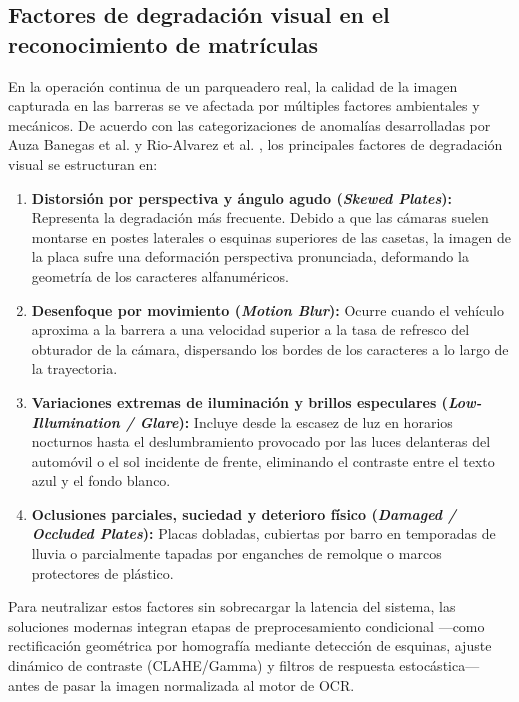 \subsection{Factores de degradación visual en el reconocimiento de matrículas}

En la operación continua de un parqueadero real, la calidad de la imagen
capturada en las barreras se ve afectada por múltiples factores ambientales y
mecánicos. De acuerdo con las categorizaciones de anomalías desarrolladas por
Auza Banegas et al. \cite{auzabanegas2026blpr} y Rio-Alvarez et al.
\cite{rioalvarez2019effects}, los principales factores de degradación visual se
estructuran en:

\begin{enumerate}
    \item \textbf{Distorsión por perspectiva y ángulo agudo (\textit{Skewed
        Plates}):} Representa la degradación más frecuente. Debido a que las
        cámaras suelen montarse en postes laterales o esquinas superiores de las
        casetas, la imagen de la placa sufre una deformación perspectiva
        pronunciada, deformando la geometría de los caracteres alfanuméricos.

    \item \textbf{Desenfoque por movimiento (\textit{Motion Blur}):} Ocurre
        cuando el vehículo aproxima a la barrera a una velocidad superior a la
        tasa de refresco del obturador de la cámara, dispersando los bordes de
        los caracteres a lo largo de la trayectoria.
        
    \item \textbf{Variaciones extremas de iluminación y brillos especulares
        (\textit{Low-Illumination / Glare}):} Incluye desde la escasez de luz en
        horarios nocturnos hasta el deslumbramiento provocado por las luces
        delanteras del automóvil o el sol incidente de frente, eliminando el
        contraste entre el texto azul y el fondo blanco.

    \item \textbf{Oclusiones parciales, suciedad y deterioro físico
        (\textit{Damaged / Occluded Plates}):} Placas dobladas, cubiertas por
        barro en temporadas de lluvia o parcialmente tapadas por enganches de
        remolque o marcos protectores de plástico.
\end{enumerate}

Para neutralizar estos factores sin sobrecargar la latencia del sistema, las
soluciones modernas integran etapas de preprocesamiento condicional —como
rectificación geométrica por homografía mediante detección de esquinas, ajuste
dinámico de contraste (CLAHE/Gamma) y filtros de respuesta estocástica— antes de
pasar la imagen normalizada al motor de OCR.
